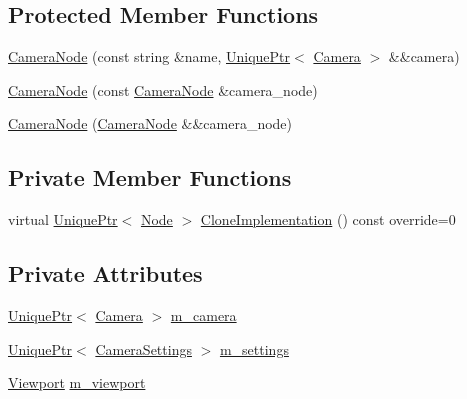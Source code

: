 \subsection*{Protected Member Functions}
\begin{DoxyCompactItemize}
\item 
\hyperlink{classmage_1_1_camera_node_a943cecfc5f96ad22f0f64d0f7b3f3640}{Camera\+Node} (const string \&name, \hyperlink{namespacemage_a3316d7143a973e37adf1110f2e80ca31}{Unique\+Ptr}$<$ \hyperlink{classmage_1_1_camera}{Camera} $>$ \&\&camera)
\item 
\hyperlink{classmage_1_1_camera_node_aa0becc29c416c313ebda763edb1b2181}{Camera\+Node} (const \hyperlink{classmage_1_1_camera_node}{Camera\+Node} \&camera\+\_\+node)
\item 
\hyperlink{classmage_1_1_camera_node_af46b911ecf12ed7c3cb31fb98a590fc1}{Camera\+Node} (\hyperlink{classmage_1_1_camera_node}{Camera\+Node} \&\&camera\+\_\+node)
\end{DoxyCompactItemize}
\subsection*{Private Member Functions}
\begin{DoxyCompactItemize}
\item 
virtual \hyperlink{namespacemage_a3316d7143a973e37adf1110f2e80ca31}{Unique\+Ptr}$<$ \hyperlink{classmage_1_1_node}{Node} $>$ \hyperlink{classmage_1_1_camera_node_a002d3a2b41cda270a26ca5d8f3a17f55}{Clone\+Implementation} () const override=0
\end{DoxyCompactItemize}
\subsection*{Private Attributes}
\begin{DoxyCompactItemize}
\item 
\hyperlink{namespacemage_a3316d7143a973e37adf1110f2e80ca31}{Unique\+Ptr}$<$ \hyperlink{classmage_1_1_camera}{Camera} $>$ \hyperlink{classmage_1_1_camera_node_a18f00f7ccd0c677043e11a1b3085dbfb}{m\+\_\+camera}
\item 
\hyperlink{namespacemage_a3316d7143a973e37adf1110f2e80ca31}{Unique\+Ptr}$<$ \hyperlink{structmage_1_1_camera_settings}{Camera\+Settings} $>$ \hyperlink{classmage_1_1_camera_node_aa8b1f1204534b3ee271e62b7cfe0f833}{m\+\_\+settings}
\item 
\hyperlink{classmage_1_1_viewport}{Viewport} \hyperlink{classmage_1_1_camera_node_a338e6f3112a167a7f81de59c7e33e87b}{m\+\_\+viewport}
\end{DoxyCompactItemize}


